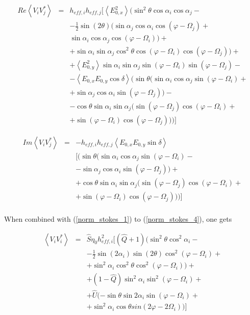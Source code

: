 \documentclass[a4paper,10pt]{thesis}
\begin{document}
\begin{eqnarray}
Re \left\langle V_i V_j^{*}\right\rangle &=&  h_{eff,i} h_{eff,j}[\left\langle E_{0,x}^2\right\rangle (\sin^2 \theta \cos \alpha_i \cos \alpha_j - \\
& & - \frac{1}{2}  \sin(2\theta) (\sin \alpha_j \cos \alpha_i \cos(\varphi - \Omega_j)+\nonumber \\
& & \sin \alpha_i \cos \alpha_j \cos(\varphi - \Omega_i) ) + \nonumber \\
& & + \sin \alpha_i \sin \alpha_j \cos^2\theta \cos(\varphi - \Omega_i) \cos(\varphi - \Omega_j))+ \nonumber \\
& & + \left\langle E_{0,y}^2 \right\rangle \sin \alpha_i \sin \alpha_j \sin (\varphi - \Omega_i) \sin (\varphi - \Omega_j)-\nonumber \\
& & -\left\langle E_{0,x} E_{0,y} \cos\delta \right\rangle(\sin \theta(\sin \alpha_i \cos \alpha_j \sin (\varphi - \Omega_i) +  \nonumber \\
& & + \sin \alpha_j \cos \alpha_i \sin (\varphi - \Omega_j))-\nonumber \\
& & -\cos \theta \sin \alpha_i \sin \alpha_j(\sin (\varphi - \Omega_j) \cos (\varphi - \Omega_i)+ \nonumber \\
& & + \sin (\varphi - \Omega_i) \cos (\varphi - \Omega_j) ) )]\nonumber
\end{eqnarray}

\begin{eqnarray}
Im \left\langle V_i V_j^{*}\right\rangle &=& - h_{eff,i} h_{eff,j}\left\langle E_{0,x} E_{0,y} \sin \delta \right\rangle \\
& & [ (\sin \theta(\sin \alpha_i \cos \alpha_j \sin (\varphi - \Omega_i) -  \nonumber \\
& & - \sin \alpha_j \cos \alpha_i \sin (\varphi - \Omega_j))+ \nonumber \\
& & + \cos \theta \sin \alpha_i \sin \alpha_j(\sin (\varphi - \Omega_j) \cos (\varphi - \Omega_i)+ \nonumber \\
& & + \sin (\varphi - \Omega_i) \cos (\varphi - \Omega_j) ) )]\nonumber
\end{eqnarray}

\paragraph*{}
When combined with (\ref{norm_stokes_1}) to (\ref{norm_stokes_4}), one gets

\begin{eqnarray}
\left\langle V_i V_i^{*} \right\rangle &=& \hat{S}\eta_0 h_{eff,i}^2[(\hat{Q}+1) (\sin^2 \theta \cos^2 \alpha_i -\\
& & -\frac{1}{2} \sin (2\alpha_i) \sin(2\theta) \cos^2(\varphi - \Omega_i) + \nonumber \\
& & + \sin^2\alpha_i \cos^2\theta \cos^2(\varphi - \Omega_i))+ \nonumber \\
& & + (1-\hat{Q}) \sin^2\alpha_i \sin^2 (\varphi - \Omega_i)+ \nonumber \\
& & +  \hat{U}  (-\sin \theta \sin 2\alpha_i \sin(\varphi - \Omega_i) +\nonumber \\
& & + \sin^2\alpha_i \cos \theta sin(2\varphi - 2\Omega_i)) ]\nonumber
\end{eqnarray}
\end{document}
